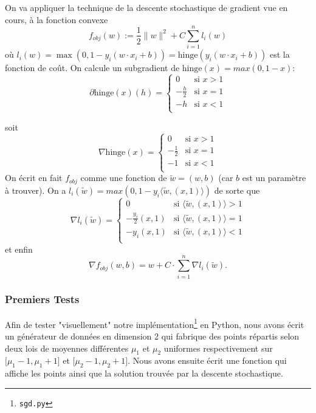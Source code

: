 \documentclass{article}
\begin{document}
On va appliquer la technique de la descente stochastique de gradient vue en cours, à la fonction convexe
\[ f_{obj}(w) := \frac{1}{2} \|w\|^2 + C\displaystyle\sum\limits_{i=1}^{n}l_i(w) \]
où $l_i(w) = \max (0, 1 - y_i (w \cdot x_i + b)) = \mathrm{hinge}(y_i (w \cdot x_i + b))$ est la fonction de coût.
On calcule un subgradient de $\mathrm{hinge}(x) = max(0,1-x)$:
\[ \partial \mathrm{hinge}(x)(h) = \begin{cases} 0 &\mbox{si } x>1 \\
-\frac{h}{2} & \mbox{si } x=1\\
-h & \mbox{si } x<1\\
 \end{cases}\]
 
 soit 
\[ \nabla \mathrm{hinge}(x) = \begin{cases} 0 &\mbox{si } x>1 \\
-\frac{1}{2} & \mbox{si } x=1\\
-1 & \mbox{si } x<1\\
 \end{cases}\]
On écrit en fait $f_{obj}$ comme une fonction de $\tilde{w} = (w,b)$ (car $b$ est un paramètre à trouver).
On a $l_i (\tilde{w}) = max(0, 1 - y_i \langle \tilde{w} , (x,1) \rangle)$ de sorte que
\[ \nabla l_i(\tilde{w}) = \begin{cases} 0 &\mbox{si } \langle \tilde{w}, (x,1) \rangle >1 \\
-\frac{y_i}{2} (x,1) & \mbox{si } \langle \tilde{w}, (x,1) \rangle=1\\
-y_i (x,1) & \mbox{si } \langle \tilde{w}, (x,1) \rangle<1\\
 \end{cases}\]
 et enfin
 \[ \nabla f_{obj}(w,b) = w + C \cdot \displaystyle\sum\limits_{i=1}^{n} \nabla l_i(\tilde{w}). \]

\subsubsection{Premiers Tests}
\label{donnees}
Afin de tester "visuellement" notre implémentation\footnote{\texttt{sgd.py}} en Python, nous avons écrit un générateur de données en dimension 2 qui fabrique des points répartis selon deux lois de moyennes différentes $\mu_1$ et $\mu_2$ uniformes respectivement sur $\lbrack \mu_1 - 1, \mu_1 + 1\rbrack$ et $\lbrack \mu_2 - 1, \mu_2 + 1\rbrack$.
Nous avons ensuite écrit une fonction qui affiche les points ainsi que la solution trouvée par la descente stochastique.
\end{document}
